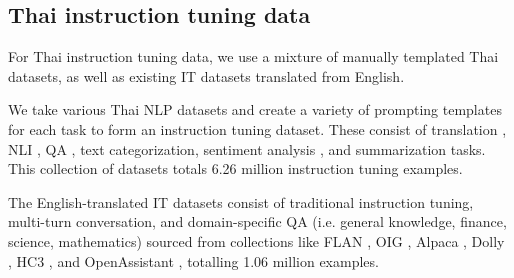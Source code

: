 \subsection{Thai instruction tuning data}\label{thai instruction tuning corpus}
For Thai instruction tuning data, we use a mixture of manually templated Thai datasets, as well as existing IT datasets translated from English. 

We take various Thai NLP datasets and create a variety of prompting templates for each task to form an instruction tuning dataset. These consist of translation \cite{Nomoto2019InterpersonalMA} \cite{BuschbeckWolf2020APE} \cite{Riza2016IntroductionOT} \cite{Ladhak2020WikiLinguaAN} \cite{cettolo-etal-2012-wit3} \cite{team2022NoLL}, NLI \cite{Conneau2018XNLIEC}, QA \cite{Artetxe:etal:2019} \cite{kobkrit_viriyayudhakorn_2021_4539916}, text categorization, sentiment analysis \cite{bact_2019_3457447}, and summarization \cite{chumpolsathien_2020} \cite{hasan-etal-2021-xl} tasks. This collection of datasets totals 6.26 million instruction tuning examples.

The English-translated IT datasets consist of traditional instruction tuning, multi-turn conversation, and domain-specific QA (i.e. general knowledge, finance, science, mathematics) sourced from collections like FLAN \cite{longpre2023flan}, OIG \cite{Nguyen_2023}, Alpaca \cite{alpaca}, Dolly \cite{DatabricksBlog2023DollyV2}, HC3 \cite{guo-etal-2023-hc3}, and OpenAssistant \cite{Kopf2023OpenAssistantC}, totalling 1.06 million examples.